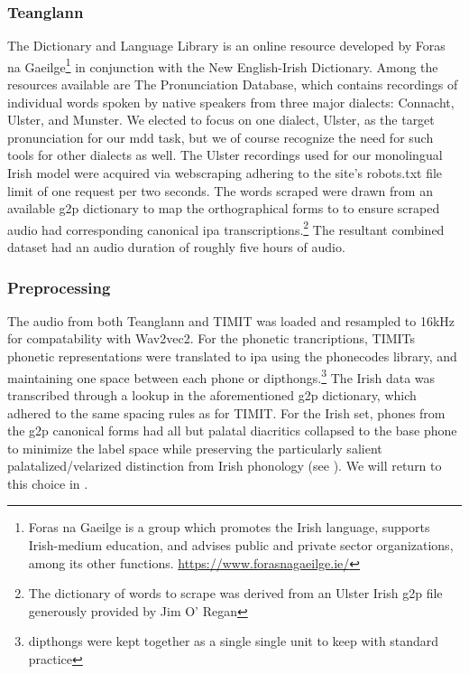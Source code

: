 \documentclass[thesis]{cluu}
\begin{document}
\subsubsection{Teanglann}\label{teanglann}
The Dictionary and Language Library is an online resource developed by Foras na Gaeilge\footnote{Foras na Gaeilge is a group which promotes the Irish language, supports Irish-medium education, and advises public and private sector organizations, among its other functions. \url{https://www.forasnagaeilge.ie/}} in conjunction with the New English-Irish Dictionary. Among the resources available are The Pronunciation Database, which contains recordings of individual words spoken by native speakers from three major dialects: Connacht, Ulster, and Munster. We elected to focus on one dialect, Ulster, as the target pronunciation for our \gls{mdd} task, but we of course recognize the need for such tools for other dialects as well. The Ulster recordings used for our monolingual Irish model were acquired via webscraping adhering to the site's robots.txt file limit of one request per two seconds. The words scraped were drawn from an available \gls{g2p} dictionary to map the orthographical forms to to ensure scraped audio had corresponding canonical \gls{ipa} transcriptions.\footnote{The dictionary of words to scrape was derived from an Ulster Irish \gls{g2p} file generously provided by Jim O' Regan} The resultant combined dataset had an audio duration of roughly five hours of audio.

\subsubsection{Preprocessing}
The audio from both Teanglann and TIMIT was loaded and resampled to 16kHz for compatability with Wav2vec2. For the phonetic trancriptions, TIMITs phonetic representations were translated to \gls{ipa} using the phonecodes library, and maintaining one space between each phone or dipthongs.\footnote{dipthongs were kept together as a single single unit to keep with standard practice} The Irish data was transcribed through a lookup in the aforementioned \gls{g2p} dictionary, which adhered to the same spacing rules as for TIMIT. For the Irish set, phones from the g2p canonical forms had all but palatal diacritics collapsed to the base phone to minimize the label space while preserving the particularly salient palatalized/velarized distinction from Irish phonology (see ). We will return to this choice in .
\end{document}
